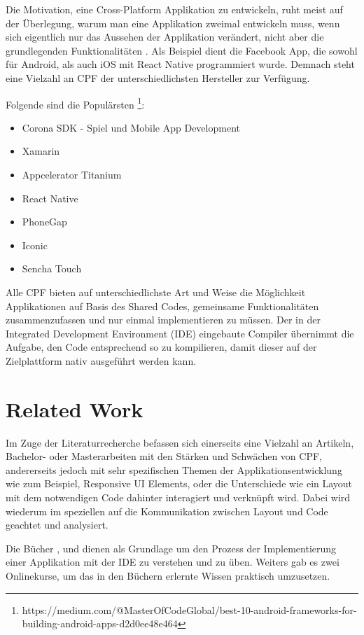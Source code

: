 	\newpage
	Die Motivation, eine Cross-Platform Applikation zu entwickeln, ruht meist auf der Überlegung, warum man eine Applikation zweimal entwickeln muss, wenn sich eigentlich nur das Aussehen der Applikation verändert, nicht aber die grundlegenden Funktionalitäten \cite{Maximilian2017}. Als Beispiel dient die Facebook App, die sowohl für Android, als auch iOS mit React Native programmiert wurde. Demnach steht eine Vielzahl an CPF der unterschiedlichsten Hersteller zur Verfügung.

	Folgende sind die Populärsten \footnote{https://medium.com/@MasterOfCodeGlobal/best-10-android-frameworks-for-building-android-apps-d2d0ee48e464}:
	\begin{itemize}
		\setlength\itemsep{0em}
		\item Corona SDK - Spiel und Mobile App Development
		\item Xamarin
		\item Appcelerator Titanium
		\item React Native
		\item PhoneGap
		\item Iconic
		\item Sencha Touch
	\end{itemize}

	Alle CPF bieten auf unterschiedlichste Art und Weise die Möglichkeit Applikationen auf Basis des \grqq Shared Codes\grqq, gemeinsame Funktionalitäten zusammenzufassen und nur einmal implementieren zu müssen. Der in der Integrated Development Environment (IDE) eingebaute Compiler übernimmt die Aufgabe, den Code entsprechend so zu kompilieren, damit dieser auf der Zielplattform nativ ausgeführt werden kann.

\newpage
\section{Related Work}
\label{sec:relatedwork}

Im Zuge der Literaturrecherche befassen sich einerseits eine Vielzahl an Artikeln, Bachelor- oder Masterarbeiten mit den Stärken und Schwächen von CPF, andererseits jedoch mit sehr spezifischen Themen der Applikationsentwicklung wie zum Beispiel, Responsive UI Elements, oder die Unterschiede wie ein Layout mit dem notwendigen Code dahinter interagiert und verknüpft wird. Dabei wird wiederum im speziellen auf die Kommunikation zwischen Layout und Code geachtet und analysiert.

Die Bücher \cite{book:Xamarin.Forms-Succinctly}, \cite{book:Xamarin.Forms-Essentials:} und \cite{book:Cross-platform-UI-Development-with-Xamarin.Forms} dienen als Grundlage um den Prozess der Implementierung einer Applikation mit der IDE zu verstehen und zu üben. Weiters gab es zwei Onlinekurse, um das in den Büchern erlernte Wissen praktisch umzusetzen.

